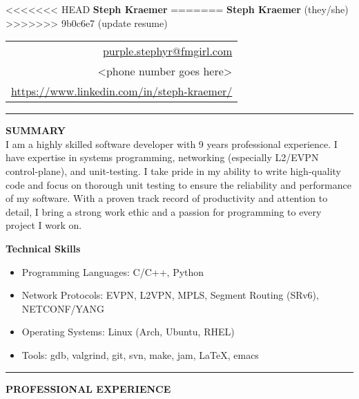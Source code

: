 \documentclass{letter}
\begin{document}
<<<<<<< HEAD
{\Huge\bf Steph Kraemer} \hfill
=======
{\Huge\bf Steph Kraemer} (they/she) \hfill
>>>>>>> 9b0c6e7 (update resume)
\begin{tabular}{r}
  \href{mailto:purple.stephyr@fmgirl.com}{purple.stephyr@fmgirl.com} \\
  <phone number goes here> \\
  \href{https://www.linkedin.com/in/steph-kraemer/}{https://www.linkedin.com/in/steph-kraemer/}
\end{tabular}

\vskip 2pt
\hrule

{\large\bf SUMMARY} \\
I am a highly skilled software developer with 9 years professional experience. I have expertise in systems programming, networking (especially L2/EVPN control-plane), and unit-testing. I take pride in my ability to write high-quality code and focus on thorough unit testing to ensure the reliability and performance of my software. With a proven track record of productivity and attention to detail, I bring a strong work ethic and a passion for programming to every project I work on.
\vskip 2pt

{\bf Technical Skills}

\begin{itemize}
  \item Programming Languages: C/C++, Python
  \item Network Protocols: EVPN, L2VPN, MPLS, Segment Routing (SRv6), NETCONF/YANG
  \item Operating Systems: Linux (Arch, Ubuntu, RHEL)
  \item Tools: gdb, valgrind, git, svn, make, jam, LaTeX, emacs
\end{itemize}

\vskip 2pt
\hrule
{\large\bf PROFESSIONAL EXPERIENCE}
\end{document}
